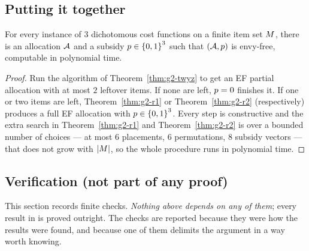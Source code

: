 \subsection{Putting it together}
\label{sec:g2-main}

\begin{theorem}[Conjecture 2 holds at $n=3$]
\label{thm:g2-main}
For every instance of $3$ dichotomous cost functions on a finite item set
$M$, there is an allocation $\mathcal{A}$ and a subsidy
$p \in \left\{0,1\right\}^3$ such that $(\mathcal{A},p)$ is envy-free,
computable in polynomial time.
\end{theorem}
\begin{proof}
Run the algorithm of Theorem~\ref{thm:g2-twyz} to get an EF partial allocation with
at most $2$ leftover items. If none are left, $p=0$ finishes it. If
one or two items are left, Theorem~\ref{thm:g2-r1} or Theorem~\ref{thm:g2-r2}
(respectively) produces a full EF allocation with $p \in
\left\{0,1\right\}^3$. Every step is constructive and the extra search in
Theorem~\ref{thm:g2-r1} and Theorem~\ref{thm:g2-r2} is over a bounded number of choices --- at most
$6$ placements, $6$ permutations, $8$ subsidy vectors --- that does not grow
with $\left\lvert M\right\rvert$, so the whole procedure runs in polynomial time.
\end{proof}

\subsection{Verification (not part of any proof)}
\label{sec:g2-verification}

This section records finite checks. \emph{Nothing above depends on any of
them}; every result in  is proved outright. The
checks are reported because they were how the results were found, and
because one of them delimits the argument in a way worth knowing.

